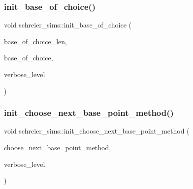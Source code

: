 \mbox{\label{classschreier__sims_adadc90eee3226f73fea23aa25575c3bc}} 
\subsubsection{\texorpdfstring{init\+\_\+base\+\_\+of\+\_\+choice()}{init\_base\_of\_choice()}}
{\footnotesize\ttfamily void schreier\+\_\+sims\+::init\+\_\+base\+\_\+of\+\_\+choice (\begin{DoxyParamCaption}\item[{\mbox{\hyperlink{galois_8h_a09fddde158a3a20bd2dcadb609de11dc}{I\+NT}}}]{base\+\_\+of\+\_\+choice\+\_\+len,  }\item[{\mbox{\hyperlink{galois_8h_a09fddde158a3a20bd2dcadb609de11dc}{I\+NT}} $\ast$}]{base\+\_\+of\+\_\+choice,  }\item[{\mbox{\hyperlink{galois_8h_a09fddde158a3a20bd2dcadb609de11dc}{I\+NT}}}]{verbose\+\_\+level }\end{DoxyParamCaption})}

\mbox{\label{classschreier__sims_a530cf960bf3ce36746fb3c8644d2601f}} 
\subsubsection{\texorpdfstring{init\+\_\+choose\+\_\+next\+\_\+base\+\_\+point\+\_\+method()}{init\_choose\_next\_base\_point\_method()}}
{\footnotesize\ttfamily void schreier\+\_\+sims\+::init\+\_\+choose\+\_\+next\+\_\+base\+\_\+point\+\_\+method (\begin{DoxyParamCaption}\item[{\mbox{\hyperlink{galois_8h_a09fddde158a3a20bd2dcadb609de11dc}{I\+NT}}($\ast$)(\mbox{\hyperlink{classaction}{action}} $\ast$\mbox{\hyperlink{simeon_8_c_a97833f04c3a9c008df5521a2fc291bb4}{A}}, \mbox{\hyperlink{galois_8h_a09fddde158a3a20bd2dcadb609de11dc}{I\+NT}} $\ast$\mbox{\hyperlink{simeon_8_c_aec1406935bdb1fee3561fcb840964100}{Elt}}, \mbox{\hyperlink{galois_8h_a09fddde158a3a20bd2dcadb609de11dc}{I\+NT}} \mbox{\hyperlink{simeon_8_c_a818073fbcc2f439e7c56952f67386122}{verbose\+\_\+level}})}]{choose\+\_\+next\+\_\+base\+\_\+point\+\_\+method,  }\item[{\mbox{\hyperlink{galois_8h_a09fddde158a3a20bd2dcadb609de11dc}{I\+NT}}}]{verbose\+\_\+level }\end{DoxyParamCaption})}

